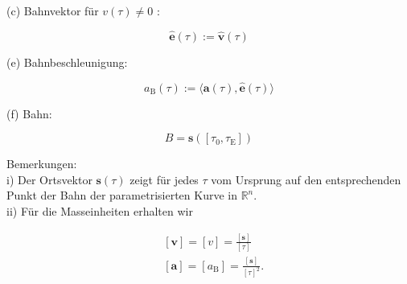 \documentclass[10pt]{article}
\begin{document}
(c) Bahnvektor für $v(\tau) \neq 0$ :

$$
\hat{\mathbf{e}}(\tau):=\hat{\mathbf{v}}(\tau)
$$

(e) Bahnbeschleunigung:

$$
a_{\mathrm{B}}(\tau):=\langle\mathbf{a}(\tau), \hat{\mathbf{e}}(\tau)\rangle
$$

(f) Bahn:

$$
B=\mathbf{s}\left(\left[\tau_{0}, \tau_{\mathrm{E}}\right]\right)
$$

Bemerkungen:\\
i) Der Ortsvektor $\mathbf{s}(\tau)$ zeigt für jedes $\tau$ vom Ursprung auf den entsprechenden Punkt der Bahn der parametrisierten Kurve in $\mathbb{R}^{n}$.\\
ii) Für die Masseinheiten erhalten wir


\begin{align*}
& {[\mathbf{v}]=[v]=\frac{[\mathbf{s}]}{[\tau]}}  \tag{2.37}\\
& {[\mathbf{a}]=\left[a_{\mathrm{B}}\right]=\frac{[\mathbf{s}]}{[\tau]^{2}} .} \tag{2.38}
\end{align*}
\end{document}
